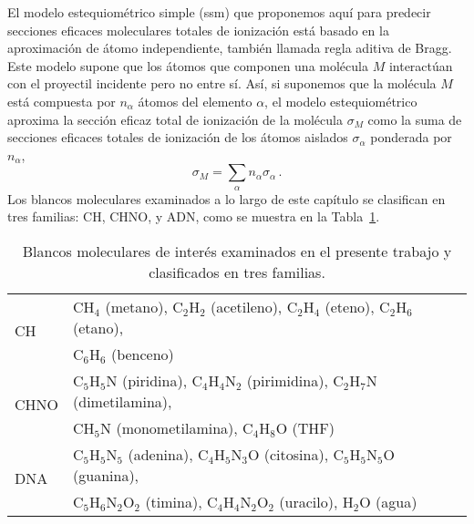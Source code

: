 El modelo estequiométrico simple (\acs{ssm}) que proponemos aquí para 
predecir secciones eficaces moleculares totales de ionización está basado 
en la aproximación de átomo independiente, también llamada regla aditiva 
de Bragg. Este modelo supone que los átomos que componen una molécula $M$ 
interactúan con el proyectil incidente pero no entre sí. Así, si 
suponemos que la molécula $M$ está compuesta por $n_{\alpha}$ átomos del 
elemento $\alpha$, el modelo estequiométrico aproxima la sección eficaz 
total de ionización de la molécula $\sigma_M$ como la suma de secciones 
eficaces totales de ionización de los átomos aislados $\sigma_{\alpha}$ 
ponderada por $n_{\alpha}$, 
\begin{equation}
\sigma_{M}=\sum\limits_{\alpha}n_{\alpha}\sigma_{\alpha}\,.  
\label{eq:sumion}
\end{equation}
Los blancos moleculares examinados a lo largo de este capítulo se 
clasifican en tres familias: CH, CHNO, y ADN, como se muestra en la 
Tabla~\ref{tab:families}.

\begin{table}
\begin{center}
\begin{tabular}{|p{}|p{}|}
\hline
\multirow{2}{*}{CH} & CH$_4$ (metano), C$_2$H$_2$ (acetileno), 
C$_2$H$_4$ (eteno), C$_2$H$_6$ (etano), \\ & C$_6$H$_6$ (benceno) \\
\hline
\multirow{2}{*}{CHNO} & C$_5$H$_5$N (piridina), C$_4$H$_4$N$_2$ (pirimidina), 
C$_2$H$_7$N (dimetilamina), \\ & CH$_5$N (monometilamina), 
C$_4$H$_8$O (THF) \\[0.2em]
\hline
\multirow{2}{*}{DNA} & C$_5$H$_5$N$_5$ (adenina), C$_4$H$_5$N$_3$O (citosina), 
C$_5$H$_5$N$_5$O (guanina), \\ & C$_5$H$_6$N$_2$O$_2$ (timina),
C$_4$H$_4$N$_2$O$_2$ (uracilo), H$_2$O (agua) \\
\hline
\end{tabular}
\caption[Blancos moleculares examinados y clasificados en tres familias.]
{Blancos moleculares de interés examinados en el presente trabajo y 
clasificados en tres familias.}
\label{tab:families}
\end{center}
\end{table}

